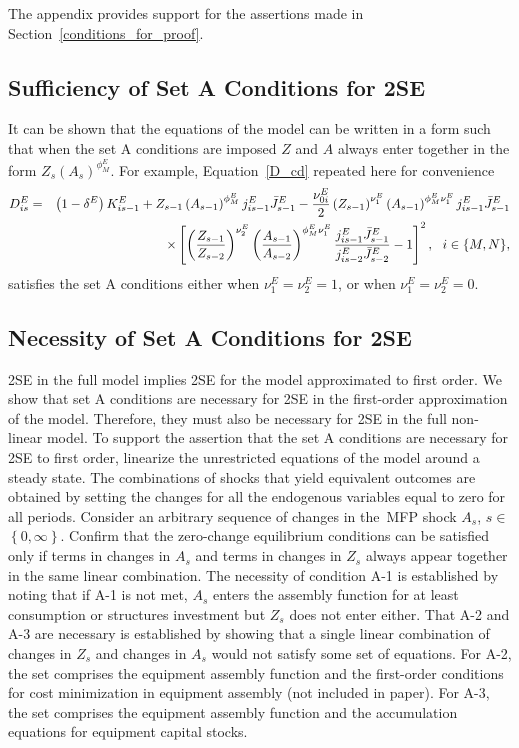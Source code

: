 \documentclass[12pt,fleqn]{article}
\begin{document}
The appendix provides support for the assertions made
in Section~\ref{conditions_for_proof}.

\subsection{Sufficiency of Set A Conditions for 2SE}

It can be shown that the equations of the model can be written in a form
such that when the set A conditions are imposed $Z$ and $A$ always enter
together in the form $Z_{s}\left( A_{s}\right) ^{\phi _{M}^{E}}$. For
example, Equation~\ref{D_cd} repeated here for convenience
\begin{eqnarray}
D_{is}^{E} &=&\left( 1-\delta ^{E}\right) K_{is-1}^{E}+Z_{s-1}\left(
A_{s-1}\right) ^{\phi _{M}^{E}}j_{is-1}^{E}\bar{J}_{s-1}^{E}-\frac{\nu
_{0i}^{E}}{2}\left( Z_{s-1}\right) ^{\nu _{1}^{E}}\left( A_{s-1}\right)
^{\phi _{M}^{E}\nu _{1}^{E}}j_{is-1}^{E}\bar{J}_{s-1}^{E}  \notag \\
&&\times \left[ \left( \frac{Z_{s-1}}{Z_{s-2}}\right) ^{\nu _{2}^{E}}\left(
\frac{A_{s-1}}{A_{s-2}}\right) ^{\phi _{M}^{E}\nu _{1}^{E}}\frac{j_{is-1}^{E}%
\bar{J}_{s-1}^{E}}{j_{is-2}^{E}\bar{J}_{s-2}^{E}}-1\right] ^{2},\,\,\,\,i\in
\{M,N\},  \notag
\end{eqnarray}%
satisfies the set A conditions either when $\nu _{1}^{E}=\nu _{2}^{E}=1$, or
when $\nu _{1}^{E}=\nu _{2}^{E}=0$.

\subsection{Necessity of Set A Conditions for 2SE}

2SE in the full model implies 2SE for the model approximated to first order.
We show that set A conditions are necessary for 2SE in the first-order
approximation of the model. Therefore, they must also be necessary for 2SE
in the full non-linear model. To support the assertion that the set A
conditions are necessary for 2SE to first order, linearize the unrestricted
equations of the model around a steady state. The combinations of shocks
that yield equivalent outcomes are obtained by setting the changes for all
the endogenous variables equal to zero for all periods. Consider an
arbitrary sequence of changes in the\ MFP shock $A_{s}$, $s\in $ $\left\{
0,\infty \right\} .$ Confirm that the zero-change equilibrium conditions can
be satisfied only if terms in changes in $A_{s}$ and terms in changes in $%
Z_{s}$ always appear together in the same linear combination. The necessity
of condition A-1 is established by noting that if A-1 is not met, $A_{s}$
enters the assembly function for at least consumption or structures
investment but $Z_{s}$ does not enter either. That A-2 and A-3 are necessary
is established by showing that a single linear combination of changes in $%
Z_{s}$ and changes in $A_{s}$ would not satisfy some set of equations. For
A-2, the set comprises the equipment assembly function and the first-order
conditions for cost minimization in equipment assembly (not included in
paper). For A-3, the set comprises the equipment assembly function and the
accumulation equations for equipment capital stocks.
\end{document}

